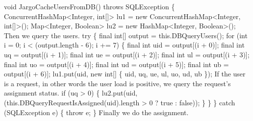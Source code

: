 void JargoCacheUsersFromDB() throws SQLException \{
\eatline
{}\nwendcode{}
\nwenddocs{}\plusendmoddef
  ConcurrentHashMap<Integer, int[]> lu1 = new ConcurrentHashMap<Integer, int[]>();
  Map<Integer, Boolean>             lu2 = new HashMap<Integer, Boolean>();
\nwendcode{}\nwdocspar
{\small Then we query the users.}
\nwenddocs{}\plusendmoddef
  try \{
    final int[] output = this.DBQueryUsers();
    for (int i = 0; i < (output.length - 6); i += 7) \{
      final int uid = output[(i + 0)];
      final int  uq = output[(i + 1)];
      final int  ue = output[(i + 2)];
      final int  ul = output[(i + 3)];
      final int  uo = output[(i + 4)];
      final int  ud = output[(i + 5)];
      final int  ub = output[(i + 6)];
      lu1.put(uid, new int[] \{ uid, uq, ue, ul, uo, ud, ub \});
\nwendcode{}\nwdocspar
{\small If the user is a request, in other words the user load is positive,
we query the request's assignment status.}
\nwenddocs{}\plusendmoddef
      if (uq > 0) \{
        lu2.put(uid, (this.DBQueryRequestIsAssigned(uid).length > 0 ? true : false));
      \}
    \}
  \} catch (SQLException e) \{
    throw e;
  \}
\nwendcode{}\nwdocspar
{\small Finally we do the assignment.}
\nwenddocs{}\plusendmoddef
